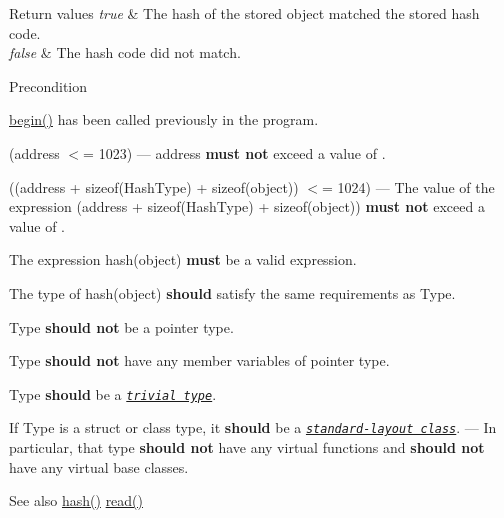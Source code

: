 \begin{DoxyRetVals}{Return values}
{\em true} & The hash of the stored object matched the stored hash code. \\
\hline
{\em false} & The hash code did not match.\\
\hline
\end{DoxyRetVals}
\begin{DoxyPrecond}{Precondition}
\begin{DoxyItemize}
\item {\ttfamily \mbox{\hyperlink{classArduboy2EEPROM_a4d482ef8e8204c56a0feba68791bc0c8}{begin()}}} has been called previously in the program. \item {\ttfamily (address $<$= 1023)} --- {\ttfamily address} {\bfseries{must not}} exceed a value of {}. \item {\ttfamily ((address + sizeof(\+Hash\+Type) + sizeof(object)) $<$= 1024)} --- The value of the expression {\ttfamily (address + sizeof(\+Hash\+Type) + sizeof(object))} {\bfseries{must not}} exceed a value of {}. \item The expression {\ttfamily hash(object)} {\bfseries{must}} be a valid expression. \item The type of {\ttfamily hash(object)} {\bfseries{should}} satisfy the same requirements as {\ttfamily Type}. \item {\ttfamily Type} {\bfseries{should not}} be a pointer type. \item {\ttfamily Type} {\bfseries{should not}} have any member variables of pointer type. \item {\ttfamily Type} {\bfseries{should}} be a \href{https://en.cppreference.com/w/cpp/named_req/TrivialType}{\texttt{ {\itshape trivial type}}}. \item If {\ttfamily Type} is a {\ttfamily struct} or {\ttfamily class} type, it {\bfseries{should}} be a \href{https://en.cppreference.com/w/cpp/language/classes\#Standard-layout_class}{\texttt{ {\itshape standard-\/layout class}}}. --- In particular, that type {\bfseries{should not}} have any {\ttfamily virtual} functions and {\bfseries{should not}} have any {\ttfamily virtual} base classes.\end{DoxyItemize}

\end{DoxyPrecond}
\begin{DoxySeeAlso}{See also}
\mbox{\hyperlink{classArduboy2EEPROM_a03bad380b02c4aa613f5a84b7e2712b6}{hash()}} \mbox{\hyperlink{classArduboy2EEPROM_a6e9b09f0b94295c040204ca0cb674649}{read()}} 
\end{DoxySeeAlso}


